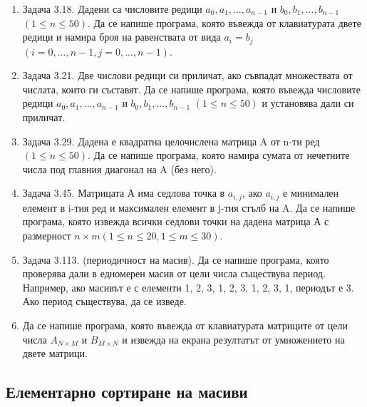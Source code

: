{\begin{enumerate}[resume]
	\item Задача 3.18. \cite{sbornik} Дадени са числовите редици $a_0, a_1, ..., a_{n-1}$ и $b_0, b_1, ..., b_{n-1}$ $(1 \leq n \leq 50)$. Да се напише програма, която въвежда от клавиатурата двете редици и намира броя на равенствата от вида $a_i = b_j$ $(i = 0, ..., n-1, j = 0, ..., n-1)$.

	\item Задача 3.21. \cite{sbornik} Две числови редици си приличат, ако съвпадат множествата от числата, които ги съставят. Да се напише програма, която въвежда числовите редици $a_0, a_1, ..., a_{n-1}$ и $b_0, b_1, ..., b_{n-1}$ $(1 \leq n \leq 50)$ и установява дали си приличат.

	\item Задача 3.29. \cite{sbornik} Дадена е квадратна целочислена матрица A от n-ти ред $(1 \leq n \leq 50)$. Да се напише програма, която намира сумата от нечетните числа под главния диагонал на A (без него).

  \item Задача 3.45. \cite{sbornik} Матрицата А има седлова точка в $a_{i,j}$, ако $a_{i,j}$ е минимален елемент в i-тия ред и максимален елемент в j-тия стълб на A. Да се напише програма, която извежда всички седлови точки на дадена матрица А с размерност $n \times m (1 \leq n \leq 20, 1 \leq m \leq 30)$.

	\item Задача 3.113. (периодичност на масив). \cite{sbornik}	Да се напише програма, която проверява дали в едномерен масив от цели числа съществува период. Например, ако масивът е с елементи 1, 2, 3, 1, 2, 3, 1, 2, 3, 1, периодът е 3. Ако период съществува, да се изведе.

	\item Да се напише програма, която въвежда от клавиатурата матриците от цели числа $A_{N\times M}$ и $B_{M\times N}$ и извежда на екрана резултатът от умножението на двете матрици.


\end{enumerate}

\subsection {Елементарно сортиране на масиви}

}
